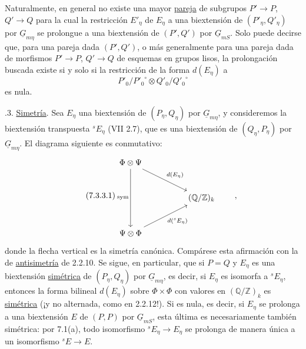 Naturalmente, en general no existe una mayor \underline{pareja} de
subgrupos $P'\to P$, $Q'\to Q$ para la cual la restricción
$E'_\eta$ de $E_\eta$ a una biextensión de
$(P'_\eta,Q'_\eta)$ por $\underline G_{m\eta}$ se prolongue a una
biextensión de $(P',Q')$ por $\underline G_{mS}$. Solo puede decirse
que, para una pareja dada $(P',Q')$, o más generalmente para una pareja
dada de morfismos $P'\to P$, $Q'\to Q$ de esquemas en grupos lisos, la
prolongación buscada existe si y solo si la restricción de la forma
$d(E_\eta)$ a
\[
 P'_0/{P'_0}^{\circ}\otimes Q'_0/{Q'_0}^{\circ}
\]
es nula.

\medskip
{}.3. \underline{Simetría}. Sea $E_\eta$ una biextensión de
$(P_\eta,Q_\eta)$ por $\underline G_{m\eta}$, y consideremos la
biextensión transpuesta ${}^{s}E_\eta$ (VII 2.7), que es una
biextensión de $(Q_\eta,P_\eta)$ por $\underline G_{m\eta}$. El
diagrama siguiente es conmutativo:
\begin{equation}\tag{7.3.3.1}
\begin{tikzcd}[row sep=large,column sep=huge]
 \Phi\otimes\Psi
   \arrow[dd,"\mathrm{sym}"']
   \arrow[rd,"d(E_\eta)"] & \\
 & (\mathbb Q/\mathbb Z)_k \\
 \Psi\otimes\Phi
   \arrow[ru,"d({}^{s}E_\eta)"'] &
\end{tikzcd}
\qquad ,
\end{equation}
donde la flecha vertical es la simetría canónica. Compárese esta
afirmación con la de \underline{antisimetría} de 2.2.10. Se sigue, en
particular, que si $P=Q$ y $E_\eta$ es una biextensión
\underline{simétrica} de $(P_\eta,Q_\eta)$ por
$\underline G_{m\eta}$, es decir, si $E_\eta$ es isomorfa a
${}^{s}E_\eta$, entonces la forma bilineal $d(E_\eta)$ sobre
$\Phi\times\Phi$ con valores en $(\mathbb Q/\mathbb Z)_k$ es
\underline{simétrica} (¡y no alternada, como en 2.2.12!). Si es nula,
es decir, si $E_\eta$ se prolonga a una biextensión $E$ de $(P,P)$ por
$\underline G_{mS}$, esta última es necesariamente también simétrica:
por 7.1(a), todo isomorfismo ${}^{s}E_\eta\to E_\eta$ se prolonga de
manera única a un isomorfismo ${}^{s}E\to E$.

